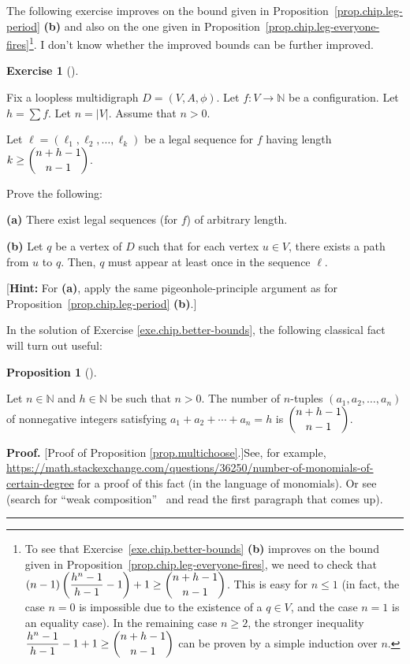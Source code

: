 \documentclass[numbers=enddot,12pt,final,onecolumn,notitlepage]{scrartcl}%
\newcounter{exer}
\theoremstyle{definition}
\newtheorem{prop}[theo]{Proposition}
\newenvironment{proposition}[1][]
{\begin{prop}[#1]\begin{leftbar}}
{\end{leftbar}\end{prop}}
\newtheorem{exmp}[exer]{Exercise}
\newenvironment{exercise}[1][]
{\begin{exmp}[#1]\begin{leftbar}}
{\end{leftbar}\end{exmp}}
\newenvironment{proof}[1][Proof]{\noindent\textbf{#1.} }{\ \rule{0.5em}{0.5em}}
\let\sumnonlimits\sum
\renewcommand{\sum}{\sumnonlimits\limits}
\newcommand{\NN}{\mathbb{N}}
\newcommand{\abs}[1]{\left| #1 \right|}
\newcommand{\tup}[1]{\left( #1 \right)}
\begin{document}
The following exercise improves on the bound given in
Proposition~\ref{prop.chip.leg-period} \textbf{(b)} and
also on the one given in
Proposition~\ref{prop.chip.leg-everyone-fires}\footnote{To
  see that Exercise~\ref{exe.chip.better-bounds} \textbf{(b)}
  improves on the bound given in
  Proposition~\ref{prop.chip.leg-everyone-fires},
  we need to check that
  $\tup{n-1} \tup{ \dfrac{h^n-1}{h-1} - 1} + 1
  \geq \dbinom{n+h-1}{n-1}$.
  This is easy for $n \leq 1$ (in fact, the case
  $n = 0$ is impossible due to the existence of a
  $q \in V$, and the case $n = 1$ is an equality
  case).
  In the remaining case $n \geq 2$,
  the stronger inequality
  $\dfrac{h^n-1}{h-1} - 1 + 1
  \geq \dbinom{n+h-1}{n-1}$
  can be proven by a simple induction
  over $n$.}.
I don't know whether the improved bounds can be further
improved.

\begin{exercise} \label{exe.chip.better-bounds}
Fix a loopless multidigraph $D = \tup{V, A, \phi}$.
Let $f : V \to \NN$ be a configuration.
Let $h = \sum f$.
Let $n = \abs{V}$.
Assume that $n > 0$.

Let $\ell = \tup{\ell_1, \ell_2, \ldots, \ell_k}$ be a
legal sequence for $f$ having length
$k \geq \dbinom{n+h-1}{n-1}$.

Prove the following:

\textbf{(a)} There exist legal sequences (for $f$) of
arbitrary length.

\textbf{(b)} Let $q$ be a vertex of $D$ such that for each vertex
$u \in V$, there exists a path from $u$ to $q$.
Then, $q$ must appear at least once in the sequence $\ell$.

[\textbf{Hint:}
For \textbf{(a)}, apply the same pigeonhole-principle argument
as for Proposition~\ref{prop.chip.leg-period} \textbf{(b)}.]
\end{exercise}

In the solution of Exercise \ref{exe.chip.better-bounds}, the following
classical fact will turn out useful:

\begin{proposition}
\label{prop.multichoose}Let $n\in\mathbb{N}$ and $h\in\mathbb{N}$ be such that
$n>0$. The number of $n$-tuples $\left(  a_{1},a_{2},\ldots,a_{n}\right)  $ of
nonnegative integers satisfying $a_{1}+a_{2}+\cdots+a_{n}=h$ is $\dbinom
{n+h-1}{n-1}$.
\end{proposition}

\begin{proof}
[Proof of Proposition \ref{prop.multichoose}.]See, for example,
\url{https://math.stackexchange.com/questions/36250/number-of-monomials-of-certain-degree}
for a proof of this fact (in the language of monomials). Or see \cite[\S 1.2]%
{Stanle11} (search for \textquotedblleft weak composition\textquotedblright%
\ and read the first paragraph that comes up).
\end{proof}
\end{document}
